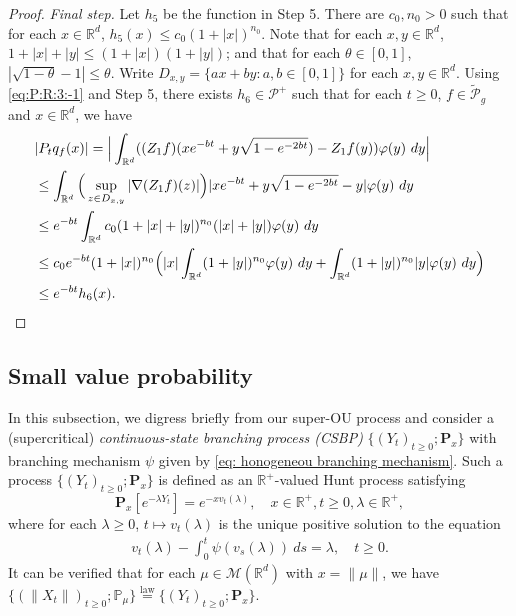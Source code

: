 \documentclass[12pt,a4paper]{amsart}
\theoremstyle{plain}
\theoremstyle{definition}
\numberwithin{equation}{section}
\begin{document}
\begin{proof}
  \emph{Final step.}
  Let $h_5$ be the function in Step 5. 
  There are $c_0, n_0> 0$ such that for each $x\in \mathbb R^d$, $h_5(x) \leq c_0(1+|x|)^{n_0}$.
  Note that for each $x, y \in \mathbb R^d$, $1+|x|+|y|\leq (1+|x|) (1+|y|)$; and that for each $\theta \in [0,1]$, $|\sqrt {1 - \theta} - 1| \leq \theta$.
  Write $D_{x,y} = \{ax+by: a, b \in [0,1]\}$ for each $x, y \in \mathbb R^d$.
  Using \eqref{eq:P:R:3:-1} and Step 5, there exists  $h_6 \in \mathcal P^+$ such that for each $t \geq 0$, $f \in \widetilde {\mathcal P}_g$ and $x \in \mathbb R^d$, we have
  \begin{align}
    & |P_t q_f(x)|
      = \Big| \int_{\mathbb R^d} ( (Z_1f)(x e^{-bt}+ y \sqrt{1 - e^{-2bt}}) - Z_1 f (y) ) \varphi(y) ~dy \Big| \\
    & \leq \int_{\mathbb R^d} \Big(\sup_{z\in D_{x,y}} |\nabla  (Z_1f) (z) |\Big) | x e^{-bt} + y \sqrt{1 - e^{-2bt}} - y | \varphi(y) ~dy \\
    & \leq e^{-bt} \int_{\mathbb R^d} c_0(1+|x|+|y|)^{n_0} (|x|+|y|) \varphi(y) ~dy \\
    & \leq c_0 e^{-bt}(1+|x|)^{n_0}\Big(|x|\int_{\mathbb R^d} (1+|y|)^{n_0}\varphi(y) ~dy + \int_{\mathbb R^d} (1+ |y|)^{n_0} |y| \varphi(y) ~dy \Big) \\
    & \leq e^{-bt} h_6(x).
      \qedhere
  \end{align}
\end{proof}

\subsection{Small value probability}
\label{sec: Small value probability}
In this subsection, we digress briefly from our super-OU process and consider a (supercritical) \emph{continuous-state branching process (CSBP)} $\{(Y_t)_{t\geq 0}; \mathbf P_x\}$ with branching mechanism $\psi$ given by \eqref{eq: honogeneou branching mechanism}.
Such a process $\{(Y_t)_{t\geq 0}; \mathbf P_x\}$ is defined as an $\mathbb R^+$-valued Hunt process satisfying
\[
  \mathbf P_x[e^{-\lambda Y_t}] = e^{- x v_t(\lambda)},
  \quad x\in \mathbb R^+, t\geq 0, \lambda \in \mathbb R^+,
\]
where for each $\lambda\geq 0$, $t\mapsto v_t(\lambda)$ is the unique positive solution to the equation
\begin{align}
  \label{eq: fkpp equation for CSBP}
  v_t(\lambda) - \int_0^t \psi(v_s(\lambda))~ds = \lambda,
  \quad t\geq 0.
\end{align}
It can be verified that for each $\mu \in \mathcal M(\mathbb R^d)$ with $x = \| \mu \|$, we have $ \{(\|X_t\|)_{t\geq 0}; \mathbb P_\mu\} \overset{\text{law}}{=} \{(Y_t)_{t\geq 0}; \mathbf P_x\}$.
\end{document}
